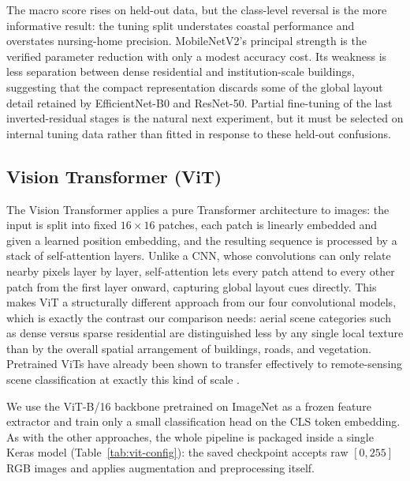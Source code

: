 \documentclass[11pt,twoside,a4paper]{article}
\begin{document}
The macro score rises on held-out data, but the class-level reversal is the
more informative result: the tuning split understates coastal performance and
overstates nursing-home precision. MobileNetV2's principal strength is the
verified parameter reduction with only a modest accuracy cost. Its weakness is
less separation between dense residential and institution-scale buildings,
suggesting that the compact representation discards some of the global layout
detail retained by EfficientNet-B0 and ResNet-50. Partial fine-tuning of the
last inverted-residual stages is the natural next experiment, but it must be
selected on internal tuning data rather than fitted in response to these
held-out confusions.

\subsection{Vision Transformer (ViT)}
The Vision Transformer \cite{Dosovitskiy2021} applies a pure Transformer
architecture to images: the input is split into fixed $16\times16$ patches,
each patch is linearly embedded and given a learned position embedding, and
the resulting sequence is processed by a stack of self-attention layers. Unlike a CNN, whose
convolutions can only relate nearby pixels layer by layer, self-attention
lets every patch attend to every other patch from the first layer onward,
capturing global layout cues directly. This makes ViT a structurally
different approach from our four convolutional models, which is exactly the
contrast our comparison needs: aerial scene categories such as dense versus
sparse residential are distinguished less by any single local texture than
by the overall spatial arrangement of buildings, roads, and vegetation.
Pretrained ViTs have already been shown to transfer effectively to
remote-sensing scene classification at exactly this kind of scale
\cite{Bazi2021}.

We use the ViT-B/16 backbone pretrained on ImageNet as a frozen feature
extractor and train only a small classification head on the CLS token
embedding. As with the other approaches, the whole pipeline is packaged
inside a single Keras model (Table~\ref{tab:vit-config}): the saved
checkpoint accepts raw $[0,255]$ RGB images and applies augmentation and
preprocessing itself.
\end{document}
